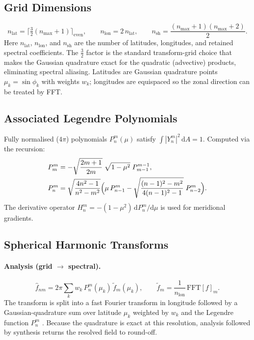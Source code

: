 \documentclass[11pt,twoside]{report}
\newcommand{\dd}{\mathrm{d}}
\begin{document}
\subsection{Grid Dimensions}
\begin{equation}
  n_{\mathrm{lat}} = \lceil\tfrac{3}{2}(n_{\max}+1)\rceil_{\mathrm{even}},
  \qquad n_{\mathrm{lon}} = 2\,n_{\mathrm{lat}},
  \qquad n_{\mathrm{sh}} = \frac{(n_{\max}+1)(n_{\max}+2)}{2}.
\end{equation}
Here $n_{\mathrm{lat}}$, $n_{\mathrm{lon}}$, and $n_{\mathrm{sh}}$ are the number
of latitudes, longitudes, and retained spectral coefficients.  The $\tfrac{3}{2}$
factor is the standard transform-grid choice that makes the Gaussian quadrature
exact for the quadratic (advective) products, eliminating spectral aliasing.
Latitudes are Gaussian quadrature points $\mu_k=\sin\phi_k$ with weights
$w_k$; longitudes are equispaced so the zonal direction can be treated by FFT.

\subsection{Associated Legendre Polynomials}

Fully normalised ($4\pi$) polynomials $P_n^m(\mu)$ satisfy
$\int|Y_n^m|^2\,\dd A=1$.  Computed via the recursion:
\begin{align}
  P_m^m &= -\sqrt{\frac{2m+1}{2m}}\;\sqrt{1-\mu^2}\;P_{m-1}^{m-1},\\
  P_n^m &= \sqrt{\frac{4n^2-1}{n^2-m^2}}
    \Bigl(\mu\,P_{n-1}^m -
    \sqrt{\frac{(n-1)^2-m^2}{4(n-1)^2-1}}\;P_{n-2}^m\Bigr).
\end{align}
The derivative operator $H_n^m=-(1-\mu^2)\,\dd P_n^m/\dd\mu$ is used for
meridional gradients.

\subsection{Spherical Harmonic Transforms}

\paragraph{Analysis (grid $\to$ spectral).}
\begin{equation}
  \hat f_{nm} = 2\pi\sum_k w_k\,P_n^m(\mu_k)\,\tilde f_m(\mu_k),
  \qquad \tilde f_m = \frac{1}{n_{\mathrm{lon}}}\,\mathrm{FFT}[f]_m.
\end{equation}
The transform is split into a fast Fourier transform in longitude followed by a
Gaussian-quadrature sum over latitude $\mu_k$ weighted by $w_k$ and the Legendre
function $P_n^m$ \citep{Bourke1972}.  Because the quadrature is exact at this
resolution, analysis followed by synthesis returns the resolved field to round-off.
\end{document}
